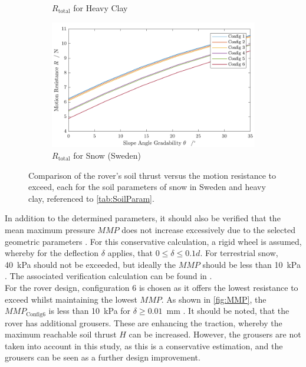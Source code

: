 \begin{figure}[htb]
\begin{subfigure}[b]{0.49\textwidth}
         \caption{\(R_\text{total}\) for Heavy Clay}
         \label{fig:RClay}
     \end{subfigure}
     \hfill
     \begin{subfigure}[b]{0.49\textwidth}
         \centering
         \includegraphics[width=\textwidth]{Media/ResistanceSnow.pdf}
         \caption{\(R_\text{total}\) for Snow (Sweden)}
         \label{fig:RSnow}
     \end{subfigure}
     \caption{Comparison of the rover's soil thrust versus the motion resistance to exceed, each for the soil parameters of snow in Sweden and heavy clay, referenced to \autoref{tab:SoilParam}.}
     \label{fig:SoilThrust_MotionResistance}
\end{figure}

In addition to the determined parameters, it should also be verified that the mean maximum pressure \(MMP\) does not increase excessively due to the selected geometric parameters \cite{MMP}. For this conservative calculation, a rigid wheel is assumed, whereby for the deflection \(\delta\) applies, that \( 0 \leq \delta \leq 0.1 d\). For terrestrial snow, 40~kPa should not be exceeded, but ideally the \(MMP\) should be less than 10~kPa \cite{Bekker}. The associated verification calculation can be found in . \\ 
For the rover design, configuration 6 is chosen as it offers the lowest resistance to exceed whilst maintaining the lowest \(MMP\). As shown in \autoref{fig:MMP}, the \(MMP_\text{Config6}\) is less than 10~kPa for \(\delta \geq 0.01\)~mm . It should be noted, that the rover has additional grousers. These are enhancing the traction, whereby the maximum reachable soil thrust \(H\) can be increased. However, the grousers are not taken into account in this study, as this is a conservative estimation, and the grousers can be seen as a further design improvement. 


